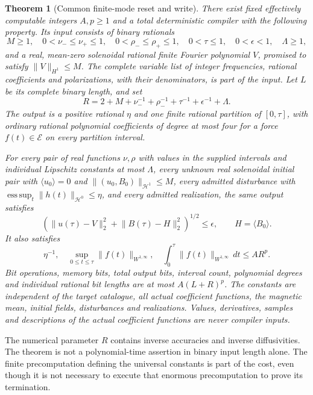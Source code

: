 \documentclass[11pt,a4paper]{amsart}
\newtheorem{theorem}{Theorem}[section]
\theoremstyle{definition}
\theoremstyle{remark}
\numberwithin{equation}{section}
\newcommand{\Hcal}{\mathcal H}
\newcommand{\Ecal}{\mathcal E}
\newcommand{\norm}[1]{\lVert #1\rVert}
\newcommand{\mean}[1]{\langle #1\rangle}
\newcommand{\esssup}{\operatorname*{ess\,sup}}
\begin{document}
\begin{theorem}[Common finite-mode reset and write]\label{thm:main}
There exist fixed effectively computable integers $A,p\ge1$ and a total deterministic compiler with the following property. Its input consists of binary rationals
\[
 M\ge1,\quad 0<\nu_-\le\nu_+\le1,\quad
 0<\rho_-\le\rho_+\le1,\quad
 0<\tau\le1,\quad0<\epsilon<1,\quad\Lambda\ge1,
\]
and a real, mean-zero solenoidal rational finite Fourier polynomial $V$, promised to satisfy $\norm V_{H^1}\le M$. The complete variable list of integer frequencies, rational coefficients and polarizations, with their denominators, is part of the input. Let $L$ be its complete binary length, and set
\begin{equation}\label{eq:R}
 R=2+M+\nu_-^{-1}+\rho_-^{-1}+\tau^{-1}+\epsilon^{-1}+\Lambda.
\end{equation}
The output is a positive rational $\eta$ and one finite rational partition of $[0,\tau]$, with ordinary rational polynomial coefficients of degree at most four for a force $f(t)\in\Ecal$ on every partition interval.

For every pair of real functions $\nu,\rho$ with values in the supplied intervals and individual Lipschitz constants at most $\Lambda$, every unknown real solenoidal initial pair with $\mean{u_0}=0$ and $\norm{(u_0,B_0)}_{\Hcal^1}\le M$, every admitted disturbance with
$\esssup_t\norm{h(t)}_{\Hcal^0}\le\eta$, and every admitted realization, the \emph{same} output satisfies
\begin{equation}\label{eq:endpoint}
 \left(\norm{u(\tau)-V}_2^2+\norm{B(\tau)-H}_2^2\right)^{1/2}
 \le\epsilon,\qquad H=\mean{B_0}.
\end{equation}
It also satisfies
\begin{equation}\label{eq:physical}
 \eta^{-1},\quad \sup_{0\le t\le\tau}\norm{f(t)}_{W^{1,\infty}},\quad
 \int_0^\tau\norm{f(t)}_{W^{1,\infty}}\,dt\le AR^p.
\end{equation}
Bit operations, memory bits, total output bits, interval count, polynomial degrees and individual rational bit lengths are at most $A(L+R)^p$. The constants are independent of the target catalogue, all actual coefficient functions, the magnetic mean, initial fields, disturbances and realizations. Values, derivatives, samples and descriptions of the actual coefficient functions are never compiler inputs.
\end{theorem}

The numerical parameter $R$ contains inverse accuracies and inverse diffusivities. The theorem is not a polynomial-time assertion in binary input length alone. The finite precomputation defining the universal constants is part of the cost, even though it is not necessary to execute that enormous precomputation to prove its termination.
\end{document}
